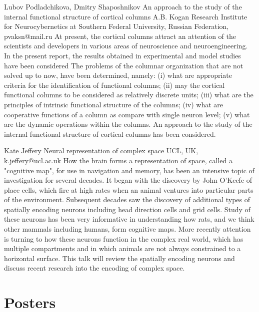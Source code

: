 \documentclass[10pt,fleqn,openany]{book} %
\begin{document}
\begin{enumerate}
	\paperabstract
		{Lubov Podladchikova, Dmitry Shaposhnikov}
		{An approach to the study of the internal functional structure of cortical columns}
		{A.B. Kogan Research Institute for Neurocybernetics at Southern Federal University, Russian Federation, pvaksn@mail.ru}
		{
			At present, the cortical columns attract an attention of the scientists and developers in various areas of neuroscience and neuroengineering. In the present report, the results obtained in experimental and model studies have been considered The problems of the columnar organization that are not solved up to now, have been determined, namely: (i) what are appropriate criteria for the identification of functional columns; (ii) may the cortical functional columns to be considered as relatively discrete units; (iii) what are the principles of intrinsic functional structure of the columns; (iv) what are cooperative functions of a column as compare with single neuron level; (v) what are the dynamic operations within the columns. An approach to the study of the internal functional structure of cortical columns has been considered.}
		
	\paperabstract
		{Kate Jeffery}
		{Neural representation of complex space}
		{UCL, UK, k.jeffery@ucl.ac.uk}
		{
			How the brain forms a representation of space, called a "cognitive map", for use in navigation and memory, has been an intensive topic of investigation for several decades. It began with the discovery by John O'Keefe of place cells, which fire at high rates when an animal ventures into particular parts of the environment. Subsequent decades saw the discovery of additional types of spatially encoding neurons including head direction cells and grid cells. Study of these neurons has been very informative in understanding how rats, and we think other mammals including humans, form cognitive maps. More recently attention is turning to how these neurons function in the complex real world, which has multiple compartments and in which animals are not always constrained to a horizontal surface. This talk will review the spatially encoding neurons and discuss recent research into the encoding of complex space.}
\end{enumerate}



\chapter{Posters}
\end{document}
